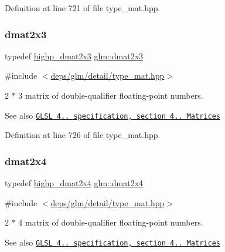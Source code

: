 Definition at line 721 of file type\+\_\+mat.\+hpp.

\mbox{\label{group__core__types_ga6b5ff9888ca0e468f35b637d4c3a361d}} 
\subsubsection{\texorpdfstring{dmat2x3}{dmat2x3}}
{\footnotesize\ttfamily typedef \hyperlink{group__core__precision_gad7de433cb7f79959a191fc5c64fbfc4e}{highp\+\_\+dmat2x3} \hyperlink{group__core__types_ga6b5ff9888ca0e468f35b637d4c3a361d}{glm\+::dmat2x3}}



{\ttfamily \#include $<$\hyperlink{type__mat_8hpp}{deps/glm/detail/type\+\_\+mat.\+hpp}$>$}

2 $\ast$ 3 matrix of double-\/qualifier floating-\/point numbers.

\begin{DoxySeeAlso}{See also}
\href{http://www.opengl.org/registry/doc/GLSLangSpec.4.20.8.pdf}{\tt G\+L\+SL 4.. specification, section 4.. Matrices} 
\end{DoxySeeAlso}


Definition at line 726 of file type\+\_\+mat.\+hpp.

\mbox{\label{group__core__types_ga2d1dd4b4925d1ea67539902c820483a0}} 
\subsubsection{\texorpdfstring{dmat2x4}{dmat2x4}}
{\footnotesize\ttfamily typedef \hyperlink{group__core__precision_gaea7c625705d849f1a55c9bfcb2585875}{highp\+\_\+dmat2x4} \hyperlink{group__core__types_ga2d1dd4b4925d1ea67539902c820483a0}{glm\+::dmat2x4}}



{\ttfamily \#include $<$\hyperlink{type__mat_8hpp}{deps/glm/detail/type\+\_\+mat.\+hpp}$>$}

2 $\ast$ 4 matrix of double-\/qualifier floating-\/point numbers.

\begin{DoxySeeAlso}{See also}
\href{http://www.opengl.org/registry/doc/GLSLangSpec.4.20.8.pdf}{\tt G\+L\+SL 4.. specification, section 4.. Matrices} 
\end{DoxySeeAlso}


